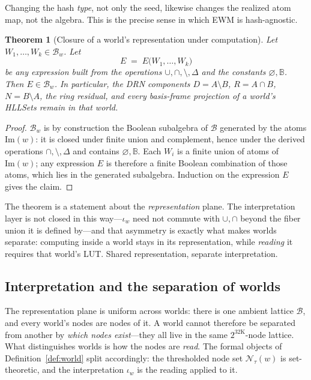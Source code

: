 \documentclass[11pt,a4paper]{article}
\newtheorem{theorem}{Theorem}[section]
\theoremstyle{remark}
\newcommand{\Lat}{\ensuremath{\mathcal{B}}}         %
\newcommand{\Plane}{\ensuremath{\mathbb{B}}}        %
\newcommand{\Img}{\ensuremath{\mathrm{Im}}}         %
\newcommand{\iotaw}{\ensuremath{\iota_{w}}}         %
\begin{document}
Changing the hash \emph{type}, not only the seed, likewise changes the realized
atom map, not the algebra. This is the precise sense in which EWM is
hash-agnostic.

\begin{theorem}[Closure of a world's representation under computation]
\label{thm:closure}
Let $W_1,\dots,W_k\in\Lat_w$. Let
\begin{equation*}
  E \;=\; E\bigl(W_1,\dots,W_k\bigr)
\end{equation*}
be any expression built from the operations $\cup,\cap,\setminus,\Delta$ and the
constants $\varnothing,\Plane$. Then $E\in\Lat_w$. In particular, the DRN
components $D=A\setminus B$, $R=A\cap B$, $N=B\setminus A$, the ring residual,
and every basis-frame projection of a world's HLLSets remain in that world.
\end{theorem}

\begin{proof}
$\Lat_w$ is by construction the Boolean subalgebra of $\Lat$ generated by the
atoms $\Img(w)$: it is closed under finite union and complement, hence under the
derived operations $\cap,\setminus,\Delta$ and contains
$\varnothing,\Plane$. Each $W_i$ is a finite union of atoms of $\Img(w)$; any
expression $E$ is therefore a finite Boolean combination of those atoms, which
lies in the generated subalgebra. Induction on the expression $E$ gives the
claim.
\end{proof}

The theorem is a statement about the \emph{representation} plane. The
interpretation layer is not closed in this way---$\iotaw$ need not commute with
$\cup,\cap$ beyond the fiber union it is defined by---and that asymmetry is
exactly what makes worlds separate: computing inside a world stays in its
representation, while \emph{reading} it requires that world's LUT. Shared
representation, separate interpretation.

\subsection{Interpretation and the separation of worlds}
\label{sec:twolevels}

The representation plane is uniform across worlds: there is one ambient lattice
$\Lat$, and every world's nodes are nodes of it. A world cannot therefore be
separated from another by \emph{which nodes exist}---they all live in the same
$2^{32\mathrm{K}}$-node lattice. What distinguishes worlds is how the nodes are
\emph{read}. The formal objects of Definition~\ref{def:world} split accordingly:
the thresholded node set $\mathcal{N}_\tau(w)$ is set-theoretic, and the
interpretation $\iotaw$ is the reading applied to it.
\end{document}
